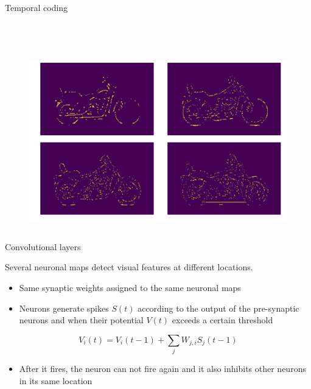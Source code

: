 \documentclass[10pt]{beamer}
\begin{document}
\begin{frame}{Temporal coding}
\begin{columns}
\begin{figure}[!h]
\begin{minipage}[b]{\textwidth}
		\end{minipage}
		\\
		\begin{minipage}[b]{\textwidth}
			\includegraphics[width=\textwidth]{images/motor_dog_out}
		\end{minipage}
	\end{figure}
\end{columns}
\end{frame}


\begin{frame}{Convolutional layers}

Several neuronal maps detect visual features at different locations.

\begin{itemize}
	\item Same synaptic weights assigned to the	same neuronal maps
	
	\item Neurons generate spikes $ S(t) $ according to the output of the pre-synaptic neurons and when their potential $ V(t) $ exceeds a certain threshold
\end{itemize}

\begin{equation*}
V_{i}(t) = V_{i}(t-1) + \sum_{j}W_{j,i}S_{j}(t-1)
\end{equation*}
\begin{itemize}
	\item After it fires, the neuron can not fire again and it also inhibits other neurons in its same location
\end{itemize}

\end{frame}
\end{document}
